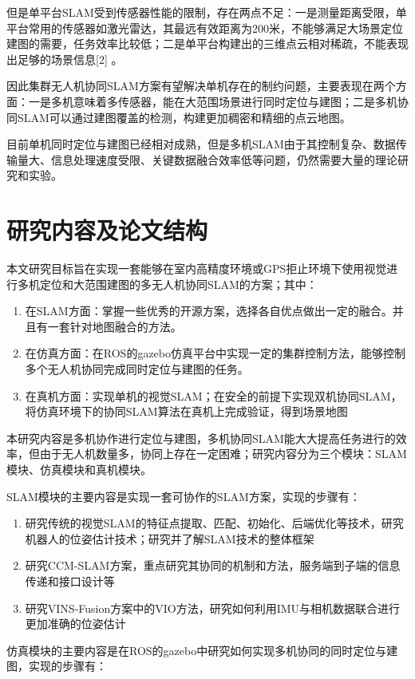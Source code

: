 但是单平台SLAM受到传感器性能的限制，存在两点不足：一是测量距离受限，单平台常用的传感器如激光雷达，其最远有效距离为200米，不能够满足大场景定位建图的需要，任务效率比较低；二是单平台构建出的三维点云相对稀疏，不能表现出足够的场景信息[2] 。

因此集群无人机协同SLAM方案有望解决单机存在的制约问题，主要表现在两个方面：一是多机意味着多传感器，能在大范围场景进行同时定位与建图；二是多机协同SLAM可以通过建图覆盖的检测，构建更加稠密和精细的点云地图。

目前单机同时定位与建图已经相对成熟，但是多机SLAM由于其控制复杂、数据传输量大、信息处理速度受限、关键数据融合效率低等问题，仍然需要大量的理论研究和实验。

\section{研究内容及论文结构}
本文研究目标旨在实现一套能够在室内高精度环境或GPS拒止环境下使用视觉进行多机定位和大范围建图的多无人机协同SLAM的方案；其中：

\begin{enumerate}
	\item 在SLAM方面：掌握一些优秀的开源方案，选择各自优点做出一定的融合。并且有一套针对地图融合的方法。
	\item 在仿真方面：在ROS的gazebo仿真平台中实现一定的集群控制方法，能够控制多个无人机协同完成同时定位与建图的任务。
	\item 在真机方面：实现单机的视觉SLAM；在安全的前提下实现双机协同SLAM，将仿真环境下的协同SLAM算法在真机上完成验证，得到场景地图
\end{enumerate}

本研究内容是多机协作进行定位与建图，多机协同SLAM能大大提高任务进行的效率，但由于无人机数量多，协同上存在一定困难；研究内容分为三个模块：SLAM模块、仿真模块和真机模块。

SLAM模块的主要内容是实现一套可协作的SLAM方案，实现的步骤有：

\begin{enumerate}
	\item 研究传统的视觉SLAM的特征点提取、匹配、初始化、后端优化等技术，研究机器人的位姿估计技术；研究并了解SLAM技术的整体框架
	\item 研究CCM-SLAM方案，重点研究其协同的机制和方法，服务端到子端的信息传递和接口设计等
	\item 研究VINS-Fusion方案中的VIO方法，研究如何利用IMU与相机数据联合进行更加准确的位姿估计
\end{enumerate}

仿真模块的主要内容是在ROS的gazebo中研究如何实现多机协同的同时定位与建图，实现的步骤有：

